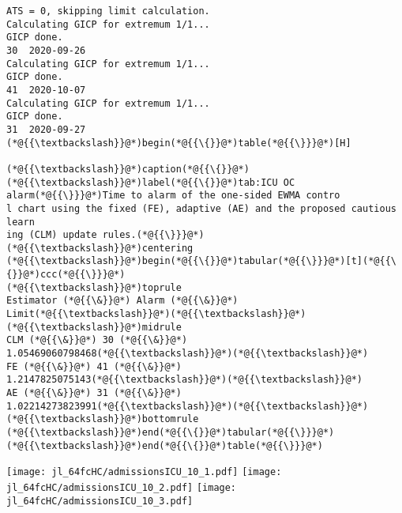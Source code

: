 \documentclass[12pt,a4paper]{article}
\begin{document}
\begin{lstlisting}
ATS = 0, skipping limit calculation.
Calculating GICP for extremum 1/1...
GICP done.
30	2020-09-26
Calculating GICP for extremum 1/1...
GICP done.
41	2020-10-07
Calculating GICP for extremum 1/1...
GICP done.
31	2020-09-27
(*@{{\textbackslash}}@*)begin(*@{{\{}}@*)table(*@{{\}}}@*)[H]

(*@{{\textbackslash}}@*)caption(*@{{\{}}@*)(*@{{\textbackslash}}@*)label(*@{{\{}}@*)tab:ICU OC alarm(*@{{\}}}@*)Time to alarm of the one-sided EWMA contro
l chart using the fixed (FE), adaptive (AE) and the proposed cautious learn
ing (CLM) update rules.(*@{{\}}}@*)
(*@{{\textbackslash}}@*)centering
(*@{{\textbackslash}}@*)begin(*@{{\{}}@*)tabular(*@{{\}}}@*)[t](*@{{\{}}@*)ccc(*@{{\}}}@*)
(*@{{\textbackslash}}@*)toprule
Estimator (*@{{\&}}@*) Alarm (*@{{\&}}@*) Limit(*@{{\textbackslash}}@*)(*@{{\textbackslash}}@*)
(*@{{\textbackslash}}@*)midrule
CLM (*@{{\&}}@*) 30 (*@{{\&}}@*) 1.05469060798468(*@{{\textbackslash}}@*)(*@{{\textbackslash}}@*)
FE (*@{{\&}}@*) 41 (*@{{\&}}@*) 1.2147825075143(*@{{\textbackslash}}@*)(*@{{\textbackslash}}@*)
AE (*@{{\&}}@*) 31 (*@{{\&}}@*) 1.02214273823991(*@{{\textbackslash}}@*)(*@{{\textbackslash}}@*)
(*@{{\textbackslash}}@*)bottomrule
(*@{{\textbackslash}}@*)end(*@{{\{}}@*)tabular(*@{{\}}}@*)
(*@{{\textbackslash}}@*)end(*@{{\{}}@*)table(*@{{\}}}@*)
\end{lstlisting}

\texttt{[image: jl\_64fcHC/admissionsICU\_10\_1.pdf]}
\texttt{[image: jl\_64fcHC/admissionsICU\_10\_2.pdf]}
\texttt{[image: jl\_64fcHC/admissionsICU\_10\_3.pdf]}
\end{document}
